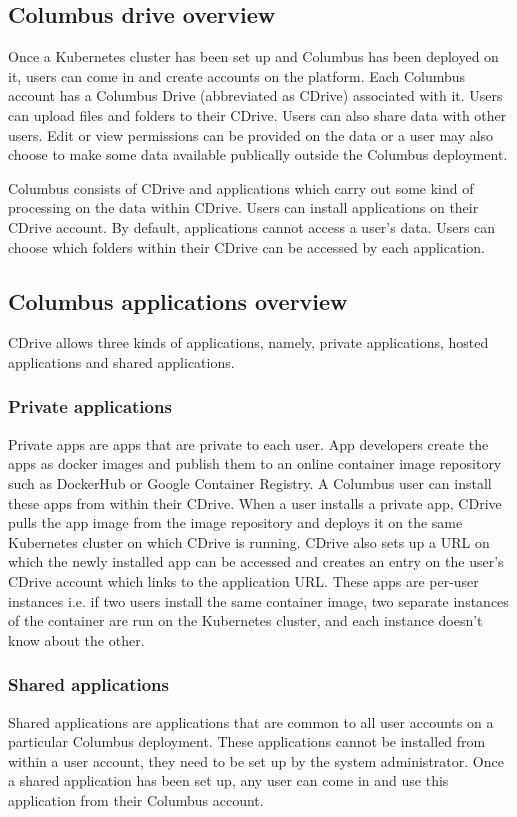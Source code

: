 \subsection{Columbus drive overview}
Once a Kubernetes cluster has been set up and Columbus has been deployed on it, users can come in
and create accounts on the platform. Each Columbus account has a Columbus Drive (abbreviated as 
CDrive) associated with it. Users can upload files and folders to their CDrive. Users can also 
share data with other users. Edit or view permissions can be provided on the data or a user may
also choose to make some data available publically outside the Columbus deployment.


Columbus consists of CDrive and applications which carry out some kind of processing on the data 
within CDrive. Users can install applications on their CDrive account. By default, applications 
cannot access a user's data. Users can choose which folders within their CDrive can be accessed 
by each application. 

\subsection{Columbus applications overview}

CDrive allows three kinds of applications, namely, private applications, hosted applications and
shared applications.

\subsubsection{Private applications}
Private apps are apps that are private to each user. App developers create the apps as docker 
images and publish them to an online container image repository such as DockerHub or Google 
Container Registry. A Columbus user can install these apps from within their CDrive. When a 
user installs a private app, CDrive pulls the app image from the image repository and deploys
it on the same Kubernetes cluster on which CDrive is running. CDrive also sets up a URL on which
the newly installed app can be accessed and creates an entry on the user's CDrive account which
links to the application URL. These apps are per-user instances i.e. if two users install the 
same container image, two separate instances of the container are run on the Kubernetes cluster,
and each instance doesn't know about the other.

\subsubsection{Shared applications}
Shared applications are applications that are common to all user accounts on a particular Columbus
deployment. These applications cannot be installed from within a user account, they need to be
set up by the system administrator. Once a shared application has been set up, any user can come
in and use this application from their Columbus account. 


